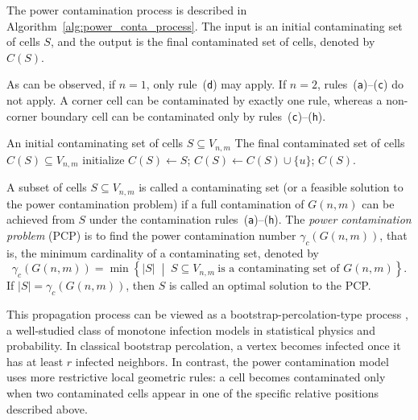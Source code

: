 \documentclass[letterpaper,12pt]{article}
\begin{document}
The power contamination process is described in Algorithm~\ref{alg:power_conta_process}. 
The input is an initial contaminating set of cells \( S \), and the output is the final contaminated set of cells, denoted by \( C(S) \).

As can be observed, if $n=1$, only rule~\textup{(\texttt{d})} may apply. If $n=2$, rules~\textup{(\texttt{a})}--\textup{(\texttt{c})} do not apply.
A corner cell can be contaminated by exactly one rule, whereas a non-corner boundary cell
can be contaminated only by rules~\textup{(\texttt{c})}--\textup{(\texttt{h})}. 

\begin{algorithm}[H]
\caption{Power Contamination Process.}
\label{alg:power_conta_process}
\begin{algorithmic}[1]
\Require An initial contaminating set of cells \( S \subseteq V_{n,m} \)
\Ensure The final contaminated set of cells \( C(S)\subseteq V_{n,m} \)
\State initialize \( C(S) \gets S \);
    \State \( C(S) \gets C(S) \cup \{u\} \);
\EndWhile
\State \Return \( C(S) \).
\end{algorithmic}
\end{algorithm}




A subset of cells $S\subseteq V_{n,m}$ is called a contaminating set (or a feasible solution to the power contamination problem) if a full contamination of $G(n,m)$ can be achieved from $S$ under the contamination rules~\textup{(\texttt{a})}--\textup{(\texttt{h})}. The \emph{power contamination problem} (PCP) is to find the power contamination number $\gamma_{c}(G(n,m))$, that is, the minimum cardinality of a contaminating set, denoted by
\[
\gamma_{c}(G(n,m)) = \min \left\{  |S| \;\middle|\; S \subseteq V_{n,m} \ \text{is a contaminating set of } G(n,m)  \right\}.
\]
If $|S|=\gamma_{c}(G(n,m))$, then $S$ is called an optimal solution to the PCP. 



This propagation process can be viewed as a bootstrap-percolation-type process \cite{Morris2017}, a well-studied class of monotone infection models in statistical physics and probability. In classical bootstrap percolation, a vertex becomes infected once it has at least \(r\) infected neighbors. In contrast, the power contamination model uses more restrictive local geometric rules: a cell becomes contaminated only when two contaminated cells appear in one of the specific relative positions described above.
\end{document}
